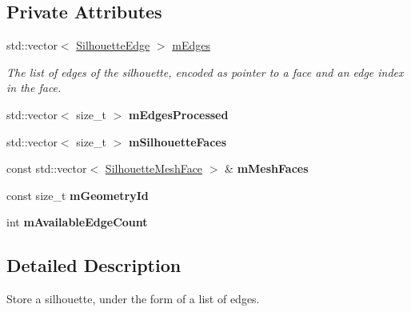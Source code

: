 \subsection*{Private Attributes}
\begin{DoxyCompactItemize}
\item 
\mbox{\label{classvisilib_1_1_silhouette_aa22b9c394c4ba8574cc1ac963b21e7e4}} 
std\+::vector$<$ \mbox{\hyperlink{structvisilib_1_1_silhouette_edge}{Silhouette\+Edge}} $>$ \mbox{\hyperlink{classvisilib_1_1_silhouette_aa22b9c394c4ba8574cc1ac963b21e7e4}{m\+Edges}}
\begin{DoxyCompactList}\small\item\em The list of edges of the silhouette, encoded as pointer to a face and an edge index in the face. \end{DoxyCompactList}\item 
\mbox{\label{classvisilib_1_1_silhouette_a35303f7e0d03e82cc1d956041434fd2b}} 
std\+::vector$<$ size\+\_\+t $>$ {\bfseries m\+Edges\+Processed}
\item 
\mbox{\label{classvisilib_1_1_silhouette_a2ae7ada30bb33142bdb1f72274e69d65}} 
std\+::vector$<$ size\+\_\+t $>$ {\bfseries m\+Silhouette\+Faces}
\item 
\mbox{\label{classvisilib_1_1_silhouette_af76d6b4b352e9c6a6e3a5bce7bc2c404}} 
const std\+::vector$<$ \mbox{\hyperlink{classvisilib_1_1_silhouette_mesh_face}{Silhouette\+Mesh\+Face}} $>$ \& {\bfseries m\+Mesh\+Faces}
\item 
\mbox{\label{classvisilib_1_1_silhouette_aff4fbf8a8c0bebd0487361b86002c4c2}} 
const size\+\_\+t {\bfseries m\+Geometry\+Id}
\item 
\mbox{\label{classvisilib_1_1_silhouette_a2f7534ae12c9330404adfc1a8a713f6a}} 
int {\bfseries m\+Available\+Edge\+Count}
\end{DoxyCompactItemize}


\subsection{Detailed Description}
Store a silhouette, under the form of a list of edges. 

